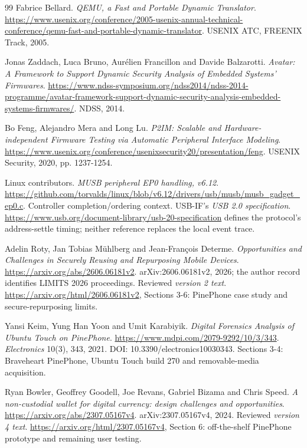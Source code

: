 \documentclass[10pt,letterpaper,twocolumn]{article}
\begin{document}
\begin{thebibliography}{99}
 Fabrice Bellard. \emph{QEMU, a Fast and Portable Dynamic Translator}. \url{https://www.usenix.org/conference/2005-usenix-annual-technical-conference/qemu-fast-and-portable-dynamic-translator}. USENIX ATC, FREENIX Track, 2005.

 Jonas Zaddach, Luca Bruno, Aurélien Francillon and Davide Balzarotti. \emph{Avatar: A Framework to Support Dynamic Security Analysis of Embedded Systems' Firmwares}. \url{https://www.ndss-symposium.org/ndss2014/ndss-2014-programme/avatar-framework-support-dynamic-security-analysis-embedded-systems-firmwares/}. NDSS, 2014.

 Bo Feng, Alejandro Mera and Long Lu. \emph{P2IM: Scalable and Hardware-independent Firmware Testing via Automatic Peripheral Interface Modeling}. \url{https://www.usenix.org/conference/usenixsecurity20/presentation/feng}. USENIX Security, 2020, pp. 1237-1254.

 Linux contributors. \emph{MUSB peripheral EP0 handling, v6.12}. \url{https://github.com/torvalds/linux/blob/v6.12/drivers/usb/musb/musb_gadget_ep0.c}. Controller completion/ordering context. USB-IF's \emph{USB 2.0 specification}. \url{https://www.usb.org/document-library/usb-20-specification} defines the protocol's address-settle timing; neither reference replaces the local event trace.

 Adelin Roty, Jan Tobias Mühlberg and Jean-François Determe. \emph{Opportunities and Challenges in Securely Reusing and Repurposing Mobile Devices}. \url{https://arxiv.org/abs/2606.06181v2}. arXiv:2606.06181v2, 2026; the author record identifies LIMITS 2026 proceedings. Reviewed \emph{version 2 text}. \url{https://arxiv.org/html/2606.06181v2}, Sections 3-6: PinePhone case study and secure-repurposing limits.

 Yansi Keim, Yung Han Yoon and Umit Karabiyik. \emph{Digital Forensics Analysis of Ubuntu Touch on PinePhone}. \url{https://www.mdpi.com/2079-9292/10/3/343}. \emph{Electronics} 10(3), 343, 2021. DOI: 10.3390/electronics10030343. Sections 3-4: Braveheart PinePhone, Ubuntu Touch build 270 and removable-media acquisition.

 Ryan Bowler, Geoffrey Goodell, Joe Revans, Gabriel Bizama and Chris Speed. \emph{A non-custodial wallet for digital currency: design challenges and opportunities}. \url{https://arxiv.org/abs/2307.05167v4}. arXiv:2307.05167v4, 2024. Reviewed \emph{version 4 text}. \url{https://arxiv.org/html/2307.05167v4}, Section 6: off-the-shelf PinePhone prototype and remaining user testing.


\end{thebibliography}
\end{document}
